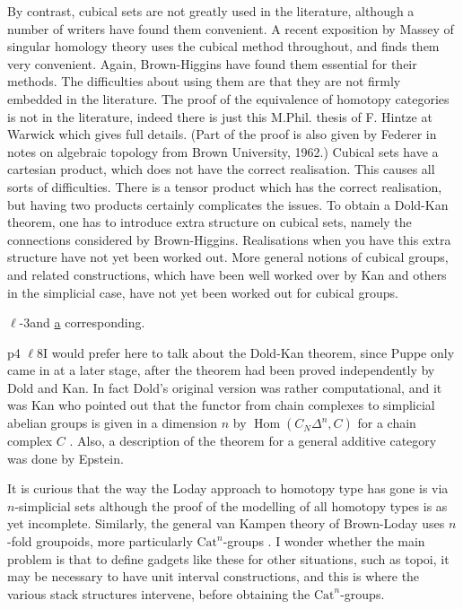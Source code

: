 By contrast, cubical sets are not greatly used in the literature, although a number of writers have found them convenient. A recent exposition by Massey of singular homology theory uses the cubical method throughout, and finds them very convenient. Again, Brown-Higgins have found them essential for their methods. The difficulties about using them are that they are not firmly embedded in the
literature. The proof of the equivalence of homotopy categories is not in the literature, indeed there is just this M.Phil. thesis of F. Hintze at Warwick which gives full details. (Part of the proof is also given by Federer in notes on algebraic topology from Brown University, 1962.) Cubical sets have a cartesian product, which does not have the correct realisation. This causes all sorts of difficulties. There is a tensor product which has the correct realisation, but having two products certainly complicates the issues. To obtain a Dold-Kan theorem, one has to introduce extra structure on cubical sets, namely the connections considered by Brown-Higgins. Realisations when you have this extra structure have not yet been worked out. More general notions of cubical groups, and related constructions, which have been well worked over by Kan and others in the simplicial case, have not yet been worked out for cubical groups.

$\ell$-3\qquad and \uline{a} corresponding.

p4 $\ell$8\qquad I would prefer here to talk about the Dold-Kan theorem, since Puppe only came in at a later stage, after the theorem had been proved independently by Dold and Kan. In fact Dold's original version was rather computational, and it was Kan who pointed out that the functor from chain complexes to simplicial abelian groups is given in a dimension $n$ by $\operatorname{Hom}(C_{N}\Delta^{n},C)$ for a chain complex $C$ . Also, a description of the theorem for a general additive category was done by Epstein.

It is curious that the way the Loday approach to homotopy type has gone is via $n$-simplicial sets although the proof of the modelling of all homotopy types is as yet incomplete. Similarly, the general van Kampen theory of Brown-Loday uses $n$-fold groupoids, more particularly $\mathrm{Cat}^{n}$-groups . I wonder whether the main problem is that to define gadgets like these for other situations, such as topoi, it may be necessary to have unit interval constructions, and this is where the various stack structures intervene, before obtaining the $\mathrm{Cat}^{n}$-groups.

